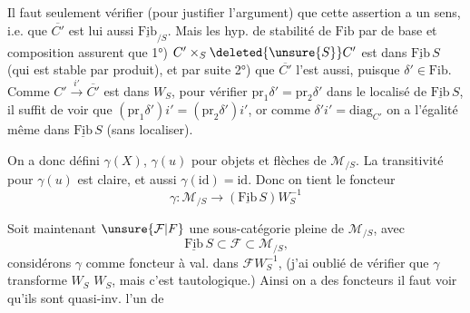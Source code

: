 Il faut seulement vérifier  (pour justifier l'argument) que cette assertion a un sens, i.e. que $\overline{C'}$ est lui aussi  $\underline{\mathrm{Fib}}_{/S}$. Mais les hyp. de stabilité de $\mathrm{Fib}$\unsure{-} par  de base et composition assurent que 1°) $C'\times_S \deleted{\unsure{S}}C'$ est dans $\underline{\mathrm{Fib}}\,S$ (qui est stable par produit), et par suite 2°) que $\overline{C'}$ l'est aussi, puisque $\delta'\in\mathrm{Fib}$.
Comme  $C'\xrightarrow{i'}\overline{C'}$ est dans $W_S$, pour vérifier $\mathrm{pr}_1\delta'=\mathrm{pr}_2\delta'$ dans le localisé de $\underline{\mathrm{Fib}}\,S$, il suffit de voir que $(\mathrm{pr}_1\delta')i'=(\mathrm{pr}_2\delta')i'$, or comme $\delta'i'=\mathrm{diag}_{C'}$ on a l'égalité même dans $\underline{\mathrm{Fib}}\,S$ (sans localiser).

On a donc défini $\gamma(X)$, $\gamma(u)$ pour objets et flèches de  $\mathcal M_{/S}$. La transitivité pour $\gamma(u)$ est claire, et aussi $\gamma(\mathrm{id})=\mathrm{id}$. Donc on tient le foncteur
\[
\gamma:\mathcal M_{/S}\longrightarrow(\underline{\mathrm{Fib}}\,S)W_S^{-1}
\]

Soit maintenant $\unsure{\mathcal F|F}$ une sous-catégorie pleine de $\mathcal M_{/S}$, avec
\[
\underline{\mathrm{Fib}}\,S\subset\mathcal F\subset\mathcal M_{/S}\text{,}
\]
considérons $\gamma$ comme foncteur à val. dans $\mathcal F W_S^{-1}$, (j'ai oublié de vérifier que $\gamma$ transforme $W_S$  $W_S$, mais c'est tautologique.) Ainsi on a des foncteurs
il faut voir qu'ils sont quasi-inv. l'un de
